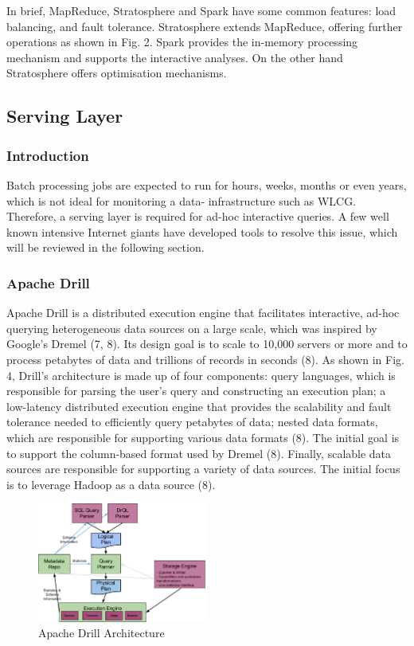 In brief, MapReduce, Stratosphere and Spark have some common features: load balancing, and fault tolerance. Stratosphere extends MapReduce, offering further operations as shown in Fig. 2. Spark provides the in-memory processing mechanism and supports the interactive analyses. On the other hand Stratosphere offers optimisation mechanisms.

\subsection{Serving Layer} \label{subsec-lr-servinglayer}

\subsubsection{Introduction} \label{subsubsec-lr-servinglayer-intro}
Batch processing jobs are expected to run for hours, weeks, months or even years, which is not ideal for monitoring a data- infrastructure such as WLCG. Therefore, a serving layer is required for ad-hoc interactive queries. A few well known intensive Internet giants have developed tools to resolve this issue, which will be reviewed in the following section.

\subsubsection{Apache Drill} \label{subsubsec-lr-servinglayer-drill}
Apache Drill is a distributed execution engine that facilitates interactive, ad-hoc querying heterogeneous data sources on a large scale, which was inspired by Google's Dremel (7, 8). Its design goal is to scale to 10,000 servers or more and to process petabytes of data and trillions of records in seconds (8). As shown in Fig. 4, Drill’s architecture is made up of four components: query languages, which is responsible for parsing the user’s query and constructing an execution plan; a low-latency distributed execution engine that provides the scalability and fault tolerance needed to efficiently query petabytes of data; nested data formats, which are responsible for supporting various data formats (8). The initial goal is to support the column-based format used by Dremel (8). Finally, scalable data sources are responsible for supporting a variety of data sources. The initial focus is to leverage Hadoop as a data source (8).

\begin{figure}[H]
\centering
\includegraphics[width=0.5\textwidth]{Figures/drill.png}
\caption{Apache Drill Architecture}\label{fig-serving-drill}
\end{figure}

